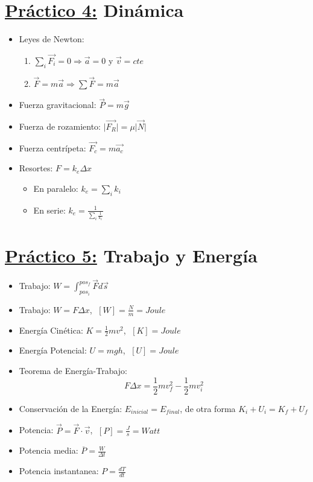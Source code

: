 \documentclass[12pt,a4paper]{article}
\providecommand{\abs}[1]{\lvert#1\rvert}
\begin{document}
	\section*{\underline{Práctico 4:} Dinámica}
		\begin{multicols}{2}
			\begin{itemize}
				\item Leyes de Newton:
				\begin{enumerate}
					\item $\sum_{i} \vec{F_{i}} = 0 \Rightarrow \vec{a} = 0$ y $\vec{v} = cte$
					\item $\vec{F} = m \vec{a} \Rightarrow \sum \vec{F} = m \vec{a}$
				\end{enumerate}
				\item Fuerza gravitacional: $\vec{P} = m \vec{g}$
				\item Fuerza de rozamiento: $\abs{\vec{F_{R}}} = \mu \abs{\vec{N}}$
				\item Fuerza centrípeta: $\vec{F_{c}} = m \vec{a_{c}}$
				\item Resortes: $F = k_{e} \Delta x$
				\begin{itemize}
					\item En paralelo: $k_{e} = \sum_{i} k_{i}$
					\item En serie: $k_{e} = \frac{1}{\sum_{i} \frac{1}{k_{e}}}$
				\end{itemize}
			\end{itemize}
		\end{multicols}

	\section*{\underline{Práctico 5:} Trabajo y Energía}
		\begin{multicols}{2}
			\begin{itemize}
				\item Trabajo: $W = \int_{pos_{i}}^{pos_{f}} \vec{F} d\vec{s}$
				\item Trabajo: $W = F \Delta x$, $\; [W] = \frac{N}{m} = Joule$
				\item Energía Cinética: $K = \frac{1}{2} m v^{2}$, $\; [K] = Joule$
				\item Energía Potencial: $U = mgh$, $\; [U] = Joule$
				\item Teorema de Energía-Trabajo:
					\[
						F \Delta x = \frac{1}{2} m v_{f}^{2} - \frac{1}{2} m v_{i}^{2}
					\]
				\item Conservación de la Energía: $E_{inicial} = E_{final}$, de otra forma $K_{i} + U_{i} = K_{f} + U_{f}$
				\item Potencia: $\vec{P} = \vec{F} \cdot \vec{v}$, $\; [P] = \frac{J}{s} = Watt$
				\item Potencia media: $\overline{P} = \frac{W}{\Delta t}$
				\item Potencia instantanea: $P = \frac{dT}{dt}$
			\end{itemize}
		\end{multicols}
\end{document}
